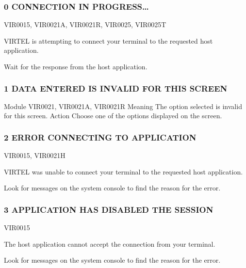 \documentclass[letterpaper,10pt,english]{sphinxmanual}
\begin{document}
\subsubsection{0 CONNECTION IN PROGRESS…}
\label{\detokenize{messages:connection-in-progress}}\begin{description}
\sphinxAtStartPar
VIR0015, VIR0021A, VIR0021R, VIR0025, VIR0025T

\sphinxAtStartPar
VIRTEL is attempting to connect your terminal to the requested host application.

\sphinxAtStartPar
Wait for the response from the host application.

\end{description}


\subsubsection{1 DATA ENTERED IS INVALID FOR THIS SCREEN}
\label{\detokenize{messages:data-entered-is-invalid-for-this-screen}}
\sphinxAtStartPar
Module
VIR0021, VIR0021A, VIR0021R
Meaning
The option selected is invalid for this screen.
Action
Choose one of the options displayed on the screen.


\subsubsection{2 ERROR CONNECTING TO APPLICATION}
\label{\detokenize{messages:error-connecting-to-application}}\begin{description}
\sphinxAtStartPar
VIR0015, VIR0021H

\sphinxAtStartPar
VIRTEL was unable to connect your terminal to the requested host application.

\sphinxAtStartPar
Look for messages on the system console to find the reason for the error.

\end{description}


\subsubsection{3 APPLICATION HAS DISABLED THE SESSION}
\label{\detokenize{messages:application-has-disabled-the-session}}\begin{description}
\sphinxAtStartPar
VIR0015

\sphinxAtStartPar
The host application cannot accept the connection from your terminal.

\sphinxAtStartPar
Look for messages on the system console to find the reason for the error.

\end{description}
\end{document}
